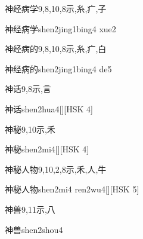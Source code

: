 \begin{Entry}{神经病学}{9,8,10,8}{⽰,⽷,⽧,⼦}
  \begin{Phonetics}{神经病学}{shen2jing1bing4 xue2}
  \end{Phonetics}
\end{Entry}

\begin{Entry}{神经病的}{9,8,10,8}{⽰,⽷,⽧,⽩}
  \begin{Phonetics}{神经病的}{shen2jing1bing4 de5}
  \end{Phonetics}
\end{Entry}

\begin{Entry}{神话}{9,8}{⽰,⾔}
  \begin{Phonetics}{神话}{shen2hua4}[][HSK 4]
  \end{Phonetics}
\end{Entry}

\begin{Entry}{神秘}{9,10}{⽰,⽲}
  \begin{Phonetics}{神秘}{shen2mi4}[][HSK 4]
  \end{Phonetics}
\end{Entry}

\begin{Entry}{神秘人物}{9,10,2,8}{⽰,⽲,⼈,⽜}
  \begin{Phonetics}{神秘人物}{shen2mi4 ren2wu4}[][HSK 5]
  \end{Phonetics}
\end{Entry}

\begin{Entry}{神兽}{9,11}{⽰,⼋}
  \begin{Phonetics}{神兽}{shen2shou4}
  \end{Phonetics}
\end{Entry}

